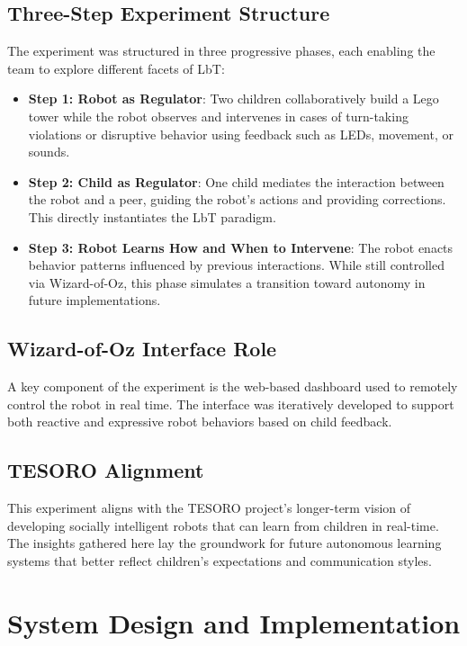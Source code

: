 \documentclass[a4paper]{usiinfbachelorproject}
\begin{document}
\subsection*{\textbf{Three-Step Experiment Structure}}
The experiment was structured in three progressive phases, each enabling the team to explore different facets of LbT:

\begin{itemize}
    \item \textbf{Step 1: Robot as Regulator}: Two children collaboratively build a Lego tower while the robot observes and intervenes in cases of turn-taking violations or disruptive behavior using feedback such as LEDs, movement, or sounds.
    \item \textbf{Step 2: Child as Regulator}: One child mediates the interaction between the robot and a peer, guiding the robot's actions and providing corrections. This directly instantiates the LbT paradigm.
    \item \textbf{Step 3: Robot Learns How and When to Intervene}: The robot enacts behavior patterns influenced by previous interactions. While still controlled via Wizard-of-Oz, this phase simulates a transition toward autonomy in future implementations.
\end{itemize}

\subsection*{\textbf{Wizard-of-Oz Interface Role}}
A key component of the experiment is the web-based dashboard used to remotely control the robot in real time.
The interface was iteratively developed to support both reactive and expressive robot behaviors based on child feedback.

\subsection*{\textbf{TESORO Alignment}}
This experiment aligns with the TESORO project's longer-term vision of developing socially intelligent robots that can learn from children in real-time.
The insights gathered here lay the groundwork for future autonomous learning systems that better reflect children's expectations and communication styles.

\section{\textbf{System Design and Implementation}}\label{sec:system}
\end{document}
